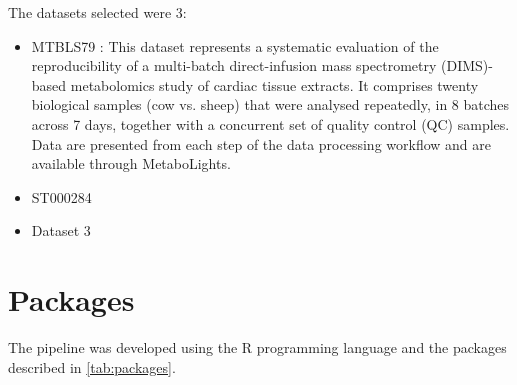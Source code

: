 \documentclass[ENG, BIB]{TFUOC}%
\begin{document}
The datasets selected were 3:
\begin{itemize}
    \item MTBLS79 \cite{kirwanDirectInfusionMass2014}: This dataset represents a systematic evaluation of the reproducibility of a multi-batch direct-infusion mass spectrometry (DIMS)-based metabolomics study of cardiac tissue extracts. It comprises twenty biological samples (cow vs. sheep) that were analysed repeatedly, in 8 batches across 7 days, together with a concurrent set of quality control (QC) samples. Data are presented from each step of the data processing workflow and are available through MetaboLights.
    \item ST000284 \cite{zhuColorectalCancerDetection2014}
    \item Dataset 3

\end{itemize}
\section{Packages} 
The pipeline was developed using the R programming language \cite{R} and the packages described in \ref{tab:packages}.
\end{document}
